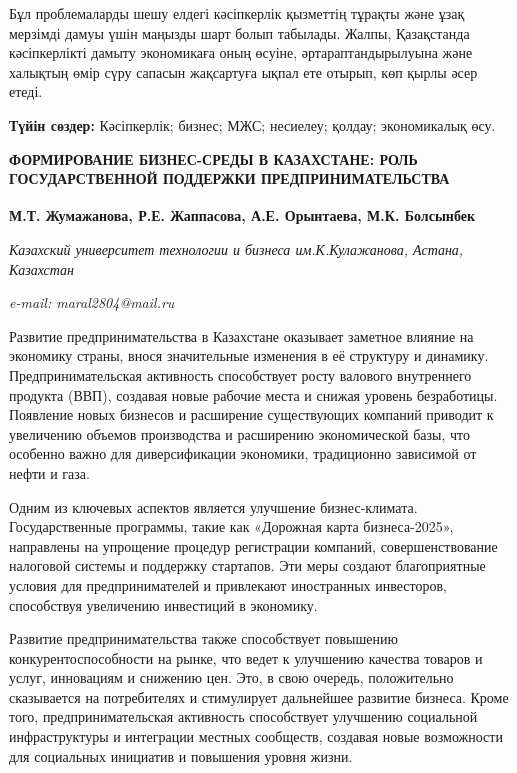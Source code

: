 Бұл проблемаларды шешу елдегі кәсіпкерлік қызметтің тұрақты және ұзақ
мерзімді дамуы үшін маңызды шарт болып табылады. Жалпы, Қазақстанда
кәсіпкерлікті дамыту экономикаға оның өсуіне, әртараптандырылуына және
халықтың өмір сүру сапасын жақсартуға ықпал ете отырып, көп қырлы әсер
етеді.

{\bfseries Түйін сөздер:} Кәсіпкерлік; бизнес; МЖС; несиелеу; қолдау;
экономикалық өсу.

\begin{articleheader}
{\bfseries ФОРМИРОВАНИЕ БИЗНЕС-СРЕДЫ В КАЗАХСТАНЕ: РОЛЬ ГОСУДАРСТВЕННОЙ ПОДДЕРЖКИ ПРЕДПРИНИМАТЕЛЬСТВА}

{\bfseries
М.Т. Жумажанова\textsuperscript{\envelope },
Р.Е. Жаппасова,
А.Е. Орынтаева,
М.К. Болсынбек}
\end{articleheader}

\begin{affiliation}
\emph{Казахский университет технологии и бизнеса им.К.Кулажанова,
Астана, Казахстан}

\emph{e-mail: maral2804@mail.ru}
\end{affiliation}

Развитие предпринимательства в Казахстане оказывает заметное влияние на
экономику страны, внося значительные изменения в её структуру и
динамику. Предпринимательская активность способствует росту валового
внутреннего продукта (ВВП), создавая новые рабочие места и снижая
уровень безработицы. Появление новых бизнесов и расширение существующих
компаний приводит к увеличению объемов производства и расширению
экономической базы, что особенно важно для диверсификации экономики,
традиционно зависимой от нефти и газа.

Одним из ключевых аспектов является улучшение бизнес-климата.
Государственные программы, такие как «Дорожная карта бизнеса-2025»,
направлены на упрощение процедур регистрации компаний, совершенствование
налоговой системы и поддержку стартапов. Эти меры создают благоприятные
условия для предпринимателей и привлекают иностранных инвесторов,
способствуя увеличению инвестиций в экономику.

Развитие предпринимательства также способствует повышению
конкурентоспособности на рынке, что ведет к улучшению качества товаров и
услуг, инновациям и снижению цен. Это, в свою очередь, положительно
сказывается на потребителях и стимулирует дальнейшее развитие бизнеса.
Кроме того, предпринимательская активность способствует улучшению
социальной инфраструктуры и интеграции местных сообществ, создавая новые
возможности для социальных инициатив и повышения уровня жизни.

